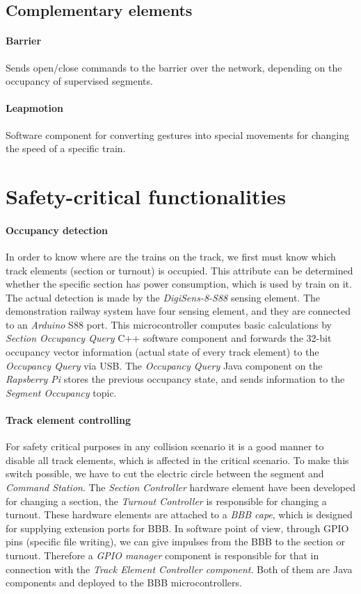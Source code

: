 \subsection{Complementary elements}
\paragraph{Barrier} 
Sends open/close commands to the barrier over the network, depending on the occupancy of supervised segments.
\paragraph{Leapmotion}
Software component for converting gestures into special movements for changing the speed of a specific train.

\section{Safety-critical functionalities}
\paragraph{Occupancy detection}\label{par:FunctionOccupancyDetection}
In order to know where are the trains on the track, we first must know which track elements (section or turnout) is occupied. This attribute can be determined whether the specific section has power consumption, which is used by train on it. The actual detection is made by the \textit{DigiSens-8-S88} sensing element. The demonstration railway system have four sensing element, and they are connected to an \textit{Arduino} S88 port. This microcontroller computes basic calculations by \textit{Section Occupancy Query} C++ software component and forwards the 32-bit occupancy vector information (actual state of every track element) to the \textit{Occupancy Query} via USB. The\textit{ Occupancy Query} Java component on the \textit{Rapsberry Pi} stores the previous occupancy state, and sends information to the \textit{Segment Occupancy} topic.

\paragraph{Track element controlling}\label{par:FunctionTEC}
For safety critical purposes in any collision scenario it is a good manner to disable all track elements, which is affected in the critical scenario. To make this switch possible, we have to cut the electric circle between the segment and \textit{Command Station}. The \textit{Section Controller} hardware element have been developed for changing a section,  the \textit{Turnout Controller} is responsible for changing a turnout. These hardware elements are attached to a \textit{BBB cape}, which is designed for supplying extension ports for BBB. In software point of view, through GPIO pins (specific file writing), we can give impulses from the BBB to the section or turnout. Therefore a \textit{GPIO manager} component is responsible for that in connection with the \textit{Track Element Controller component}. Both of them are Java components and deployed to the BBB microcontrollers.


